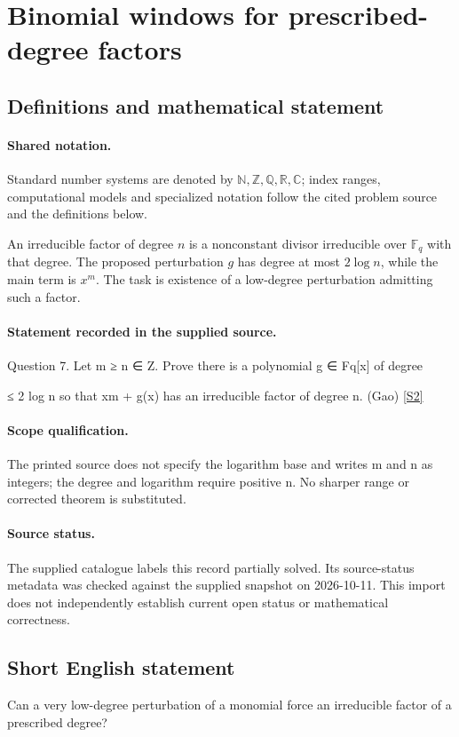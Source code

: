 \documentclass[11pt]{article}
\newcommand{\sref}[2]{\hyperlink{source:#1:#2}{[S#2]}}
\begin{document}
\section{Binomial windows for prescribed-degree factors}\label{statement}

\subsection{Definitions and mathematical statement}

\paragraph{Shared notation.}Standard number systems are denoted by $\mathbb N,\mathbb Z,\mathbb Q,\mathbb R,\mathbb C$; index ranges, computational models and specialized notation follow the cited problem source and the definitions below.


An irreducible factor of degree $n$ is a nonconstant divisor irreducible over $\mathbb F_q$ with that degree. The proposed perturbation $g$ has degree at most $2\log n$, while the main term is $x^m$. The task is existence of a low-degree perturbation admitting such a factor.
\paragraph{Statement recorded in the supplied source.}
Question 7. Let m ≥ n ∈ Z. Prove there is a polynomial g ∈ Fq[x] of degree

≤ 2 log n so that xm + g(x) has an irreducible factor of degree n. (Gao) \sref{statement}{2}
\paragraph{Scope qualification.}
The printed source does not specify the logarithm base and writes m and n as integers; the degree and logarithm require positive n. No sharper range or corrected theorem is substituted.
\paragraph{Source status.}
The supplied catalogue labels this record partially solved. Its source-status metadata was checked against the supplied snapshot on 2026-10-11. This import does not independently establish current open status or mathematical correctness.
\subsection{Short English statement}
Can a very low-degree perturbation of a monomial force an irreducible factor of a prescribed degree?
\end{document}
